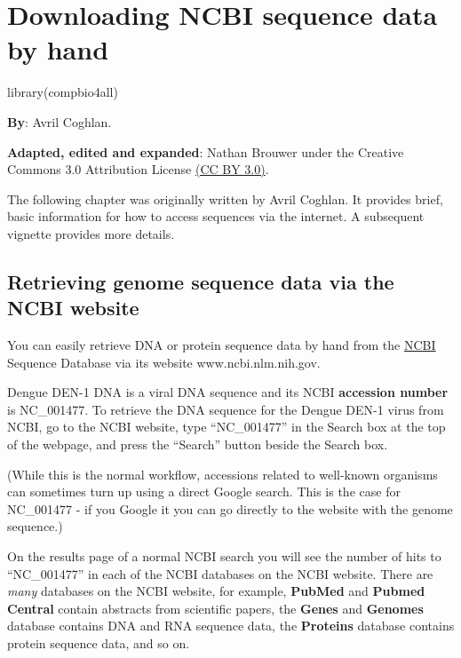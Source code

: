 \documentclass[
]{book}
\newenvironment{Shaded}{\begin{snugshade}}{\end{snugshade}}
\newcommand{\FunctionTok}[1]{\textcolor[rgb]{0.00,0.00,0.00}{#1}}
\newcommand{\NormalTok}[1]{#1}
\begin{document}
\hypertarget{downloading-ncbi-sequence-data-by-hand}{%
\chapter{Downloading NCBI sequence data by hand}\label{downloading-ncbi-sequence-data-by-hand}}

\begin{Shaded}
\begin{Highlighting}[]
\FunctionTok{library}\NormalTok{(compbio4all)}
\end{Highlighting}
\end{Shaded}

\textbf{By}: Avril Coghlan.

\textbf{Adapted, edited and expanded}: Nathan Brouwer under the Creative Commons 3.0 Attribution License \href{https://creativecommons.org/licenses/by/3.0/}{(CC BY 3.0)}.

The following chapter was originally written by Avril Coghlan. It provides brief, basic information for how to access sequences via the internet. A subsequent vignette provides more details.

\hypertarget{retrieving-genome-sequence-data-via-the-ncbi-website}{%
\section{Retrieving genome sequence data via the NCBI website}\label{retrieving-genome-sequence-data-via-the-ncbi-website}}

You can easily retrieve DNA or protein sequence data by hand from the \href{www.ncbi.nlm.nih.gov}{NCBI} Sequence Database via its website www.ncbi.nlm.nih.gov.

Dengue DEN-1 DNA is a viral DNA sequence and its NCBI \textbf{accession number} is NC\_001477. To retrieve the DNA sequence for the Dengue DEN-1 virus from NCBI, go to the NCBI website, type ``NC\_001477'' in the Search box at the top of the webpage, and press the ``Search'' button beside the Search box.

(While this is the normal workflow, accessions related to well-known organisms can sometimes turn up using a direct Google search. This is the case for NC\_001477 - if you Google it you can go directly to the website with the genome sequence.)

On the results page of a normal NCBI search you will see the number of hits to ``NC\_001477'' in each of the NCBI databases on the NCBI website. There are \emph{many} databases on the NCBI website, for example, \textbf{PubMed} and \textbf{Pubmed Central} contain abstracts from scientific papers, the \textbf{Genes} and \textbf{Genomes} database contains DNA and RNA sequence data, the \textbf{Proteins} database contains protein sequence data, and so on.
\end{document}
